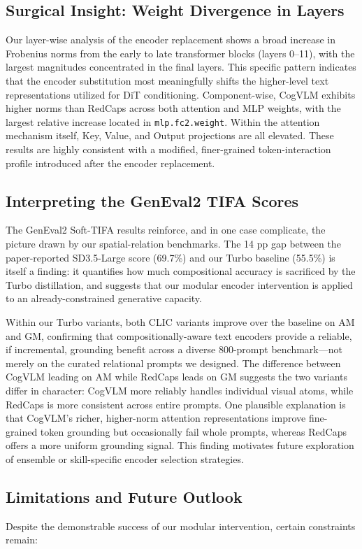 \subsection{Surgical Insight: Weight Divergence in Layers}
Our layer-wise analysis of the encoder replacement shows a broad increase in Frobenius norms from the early to late transformer blocks (layers 0--11), with the largest magnitudes concentrated in the final layers. This specific pattern indicates that the encoder substitution most meaningfully shifts the higher-level text representations utilized for DiT conditioning. Component-wise, CogVLM exhibits higher norms than RedCaps across both attention and MLP weights, with the largest relative increase located in \texttt{mlp.fc2.weight}. Within the attention mechanism itself, Key, Value, and Output projections are all elevated. These results are highly consistent with a modified, finer-grained token-interaction profile introduced after the encoder replacement.

\subsection{Interpreting the GenEval2 TIFA Scores}
The GenEval2 Soft-TIFA results reinforce, and in one case complicate, the picture drawn by our spatial-relation benchmarks. The 14 pp gap between the paper-reported SD3.5-Large score (69.7\%) and our Turbo baseline (55.5\%) is itself a finding: it quantifies how much compositional accuracy is sacrificed by the Turbo distillation, and suggests that our modular encoder intervention is applied to an already-constrained generative capacity.

Within our Turbo variants, both CLIC variants improve over the baseline on AM and GM, confirming that compositionally-aware text encoders provide a reliable, if incremental, grounding benefit across a diverse 800-prompt benchmark---not merely on the curated relational prompts we designed. The difference between CogVLM leading on AM while RedCaps leads on GM suggests the two variants differ in character: CogVLM more reliably handles individual visual atoms, while RedCaps is more consistent across entire prompts. One plausible explanation is that CogVLM's richer, higher-norm attention representations improve fine-grained token grounding but occasionally fail whole prompts, whereas RedCaps offers a more uniform grounding signal. This finding motivates future exploration of ensemble or skill-specific encoder selection strategies.

\subsection{Limitations and Future Outlook}
Despite the demonstrable success of our modular intervention, certain constraints remain:

